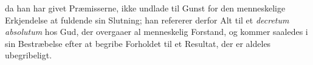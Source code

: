 \documentclass[12pt]{book}
\newcommand{\opage}[1]{\marginnote{\footnotesize\textit{[#1]}}}
\begin{document}
da han
\opage{50} \setcounter{footnote}{0}%
har givet Præmisserne, ikke undlade til Gunst for den menneskelige Erkjendelse at
fuldende sin Slutning; han refererer derfor Alt til et \textit{decretum
absolutum} hos Gud, der overgaaer al menneskelig Forstand, og kommer saaledes i
sin Bestræbelse efter at begribe Forholdet til et Resultat, der er aldeles
ubegribeligt.
\end{document}
